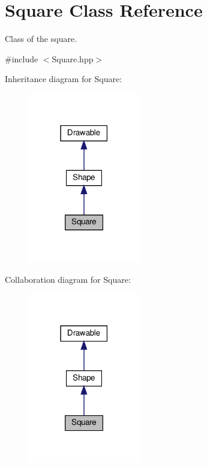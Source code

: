 \hypertarget{classSquare}{}\section{Square Class Reference}
\label{classSquare}


Class of the square.  




{\ttfamily \#include $<$Square.\+hpp$>$}



Inheritance diagram for Square\+:\nopagebreak
\begin{figure}[H]
\begin{center}
\leavevmode
\includegraphics[width=138pt]{classSquare__inherit__graph}
\end{center}
\end{figure}


Collaboration diagram for Square\+:\nopagebreak
\begin{figure}[H]
\begin{center}
\leavevmode
\includegraphics[width=138pt]{classSquare__coll__graph}
\end{center}
\end{figure}
